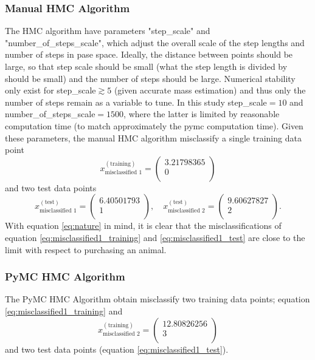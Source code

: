 \documentclass[a4paper,11pt, oneside]{article}
\theoremstyle{definition}
\begin{document}
	\subsubsection{Manual HMC Algorithm}
	\label{sec:manual_hmc_results}
	The HMC algorithm have parameters "step\_scale" and "number\_of\_steps\_scale", which adjust the overall scale of the step lengths and number of steps in pase space. Ideally, the distance between points should be large, so that step scale should be small (what the step length is divided by should be small) and the number of steps should be large. Numerical stability only exist for step\_scale$\gtrsim 5$ (given accurate mass estimation) and thus only the number of steps remain as a variable to tune. In this study step\_scale$=10$ and number\_of\_steps\_scale$=1500$, where the latter is limited by reasonable computation time (to match approximately the pymc computation time). Given these parameters, the manual HMC algorithm misclassify a single training data point
	\begin{equation}
		x^{(\text{training})}_{\text{misclassified 1}} = \begin{pmatrix}
			3.21798365\\ 0\\
		\end{pmatrix}
		\label{eq:misclassified1_training}
	\end{equation}
	and two test data points
	\begin{equation}
		x^{(\text{test})}_{\text{misclassified 1}} = \begin{pmatrix}
			6.40501793\\ 1\\
		\end{pmatrix}, \quad x^{(\text{test})}_{\text{misclassified 2}} = \begin{pmatrix}
			9.60627827\\ 2\\
		\end{pmatrix}.
		\label{eq:misclassified1_test}
	\end{equation}
	With equation \eqref{eq:nature} in mind, it is clear that the misclassifications of equation \eqref{eq:misclassified1_training} and \eqref{eq:misclassified1_test} are close to the limit with respect to purchasing an animal.  
	
	\subsubsection{PyMC HMC Algorithm}
	The PyMC HMC Algorithm obtain misclassify two training data points; equation \eqref{eq:misclassified1_training} and 
	\begin{equation}
		x^{(\text{training})}_{\text{misclassified 2}} = \begin{pmatrix}
			12.80826256\\ 3\\
		\end{pmatrix}
		\label{eq:misclassified1_training2}
	\end{equation}
	and two test data points (equation \eqref{eq:misclassified1_test}).
	
\end{document}
